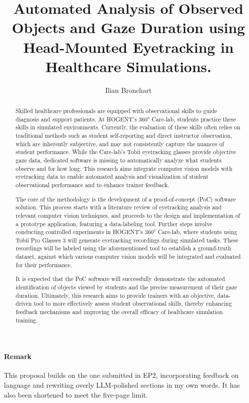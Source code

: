 \documentclass[english]{hogent-article}
\title{Automated Analysis of Observed Objects and Gaze Duration using Head-Mounted Eyetracking in Healthcare Simulations.}
\author{Ilian Bronchart}
\begin{document}
\begin{abstract}
Skilled healthcare professionals are equipped with observational skills to guide diagnosis and support patients.
At HOGENT's 360° Care-lab, students practice these skills in simulated environments.
Currently, the evaluation of these skills often relies on traditional methods such as student 
self-reporting and direct instructor observation, which are inherently subjective, and may not 
consistently capture the nuances of student performance. 
While the Care-lab's Tobii eyetracking glasses provide objective gaze data, dedicated software 
is missing to automatically analyze what students observe and for how long.
This research aims integrate computer vision models with eyetracking data 
to enable automated analysis and visualization of student observational performance and to enhance trainer feedback.

The core of the methodology is the development of a proof-of-concept (PoC) software solution. 
This process starts with a literature review of eyetracking analysis and relevant computer vision techniques, 
and proceeds to the design and implementation of a prototype application, featuring a data-labeling tool. 
Further steps involve conducting controlled experiments in HOGENT's 360° Care-lab, 
where students using Tobii Pro Glasses 3 will generate eyetracking recordings during simulated tasks. 
These recordings will be labeled using the aforementioned tool to establish a ground-truth dataset, 
against which various computer vision models will be integrated and evaluated for their 
performance.

It is expected that the PoC software will successfully demonstrate the automated identification 
of objects viewed by students and the precise measurement of their gaze duration. 
Ultimately, this research aims to provide trainers with an objective, data-driven tool to more effectively assess 
student observational skills, thereby enhancing feedback mechanisms and improving the overall efficacy of healthcare simulation training.
\end{abstract}

\bigskip

\paragraph{Remark}

This proposal builds on the one submitted in EP2, incorporating feedback on language and rewriting overly LLM-polished sections in my own words. 
It has also been shortened to meet the five-page limit.
\end{document}
